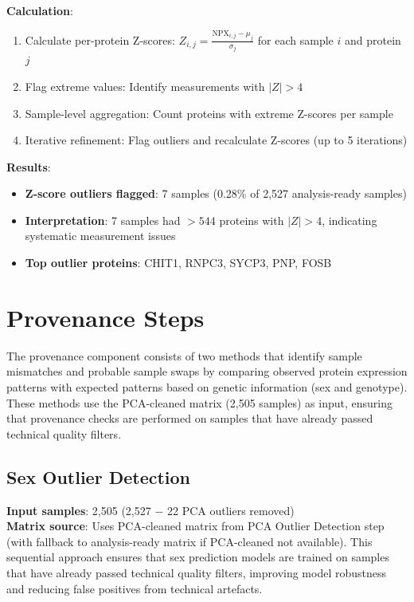 \documentclass[11pt,a4paper]{article}
\begin{document}
\textbf{Calculation}:
\begin{enumerate}
\item Calculate per-protein Z-scores: $Z_{i,j} = \frac{\text{NPX}_{i,j} - \mu_j}{\sigma_j}$ for each sample $i$ and protein $j$
\item Flag extreme values: Identify measurements with $|Z| > 4$
\item Sample-level aggregation: Count proteins with extreme Z-scores per sample
\item Iterative refinement: Flag outliers and recalculate Z-scores (up to 5 iterations)
\end{enumerate}

\textbf{Results}:
\begin{itemize}
\item \textbf{Z-score outliers flagged}: 7 samples (0.28\% of 2,527 analysis-ready samples)
\item \textbf{Interpretation}: 7 samples had $>544$ proteins with $|Z| > 4$, indicating systematic measurement issues
\item \textbf{Top outlier proteins}: CHIT1, RNPC3, SYCP3, PNP, FOSB
\end{itemize}

\section{Provenance Steps}

The provenance component consists of two methods that identify sample mismatches and probable sample swaps by comparing observed protein expression patterns with expected patterns based on genetic information (sex and genotype). These methods use the PCA-cleaned matrix (2,505 samples) as input, ensuring that provenance checks are performed on samples that have already passed technical quality filters.

\subsection{Sex Outlier Detection}
\textbf{Input samples}: 2,505 (2,527 $-$ 22 PCA outliers removed)\\
\textbf{Matrix source}: Uses PCA-cleaned matrix from PCA Outlier Detection step (with fallback to analysis-ready matrix if PCA-cleaned not available). This sequential approach ensures that sex prediction models are trained on samples that have already passed technical quality filters, improving model robustness and reducing false positives from technical artefacts.\\
\end{document}

